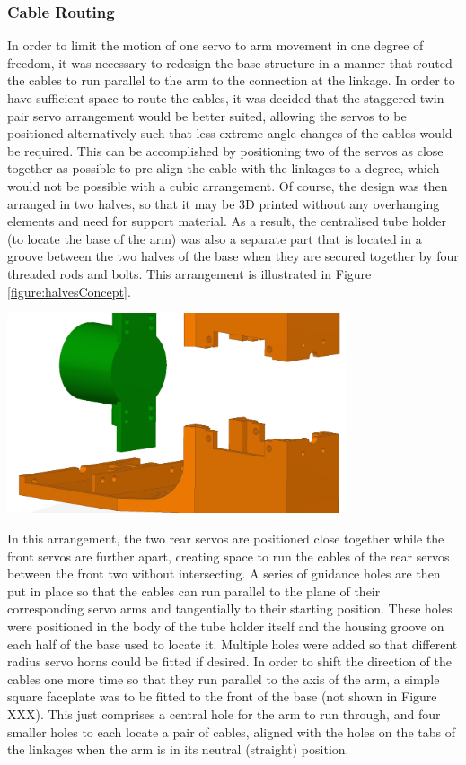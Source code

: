 \documentclass[11pt]{article}
\begin{document}
\subsubsection{Cable Routing}
In order to limit the motion of one servo to arm movement in one degree of freedom, it was necessary to redesign the base structure in a manner that routed the cables to run parallel to the arm to the connection at the linkage. In order to have sufficient space to route the cables, it was decided that the staggered twin-pair servo arrangement would be better suited, allowing the servos to be positioned alternatively such that less extreme angle changes of the cables would be required. This can be accomplished by positioning two of the servos as close together as possible to pre-align the cable with the linkages to a degree, which would not be possible with a cubic arrangement. Of course, the design was then arranged in two halves, so that it may be 3D printed without any overhanging elements and need for support material. As a result, the centralised tube holder (to locate the base of the arm) was also a separate part that is located in a groove between the two halves of the base when they are secured together by four threaded rods and bolts. This arrangement is illustrated in Figure \ref{figure:halvesConcept}.

\begin{center}
\includegraphics[width=0.75\textwidth]{images/halvesConcept.png}
\label{figure:halvesConcept}
\end{center}

In this arrangement, the two rear servos are positioned close together while the front servos are further apart, creating space to run the cables of the rear servos between the front two without intersecting. A series of guidance holes are then put in place so that the cables can run parallel to the plane of their corresponding servo arms and tangentially to their starting position. These holes were positioned in the body of the tube holder itself and the housing groove on each half of the base used to locate it. Multiple holes were added so that different radius servo horns could be fitted if desired. In order to shift the direction of the cables one more time so that they run parallel to the axis of the arm, a simple square faceplate was to be fitted to the front of the base (not shown in Figure XXX). This just comprises a central hole for the arm to run through, and four smaller holes to each locate a pair of cables, aligned with the holes on the tabs of the linkages when the arm is in its neutral (straight) position.
\end{document}
